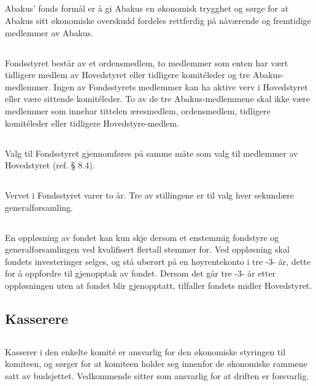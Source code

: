 \subsection{}
Abakus’ fonds formål er å gi Abakus en økonomisk trygghet og sørge for at Abakus sitt
økonomiske overskudd fordeles rettferdig på nåværende og fremtidige medlemmer av Abakus.

\subsection{}
Fondsstyret består av et ordensmedlem, to medlemmer som enten har vært tidligere medlem av
Hovedstyret eller tidligere komitéleder og tre Abakus-medlemmer. Ingen av Fondsstyrets medlemmer kan ha
aktive verv i Hovedstyret eller være sittende komitéleder. To av de tre Abakus-medlemmene skal ikke være 
medlemmer som innehar tittelen æresmedlem, ordensmedlem, tidligere komitéleder eller tidligere Hovedstyre-medlem.

\subsection{}
Valg til Fondsstyret gjennomføres på samme måte som valg til medlemmer av Hovedstyret (ref. § 8.4).

\subsection{}
Vervet i Fondsstyret varer to år. Tre av stillingene er til valg hver sekundære generalforsamling.

\subsection{}
En oppløsning av fondet kan kun skje dersom et enstemmig fondstyre og generalforsamlingen
ved kvalifisert flertall stemmer for. Ved oppløsning skal fondets investeringer selges, og stå
uberørt på en høyrentekonto i tre -3- år, dette for å oppfordre til gjenopptak av fondet. Dersom
det går tre -3- år etter oppløsningen uten at fondet blir gjenopptatt, tilfaller fondets midler
Hovedstyret.

\subsection{Kasserere}

\subsection{}
Kasserer i den enkelte komité er ansvarlig for den økonomiske styringen til
komiteen, og sørger for at komiteen holder seg innenfor de økonomiske rammene satt av budsjettet.
Vedkommende sitter som ansvarlig for at driften er forsvarlig.

